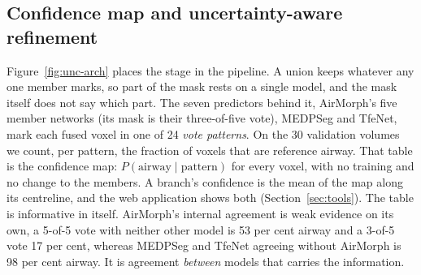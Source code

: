 \documentclass[runningheads]{llncs}
\begin{document}
\subsection{Confidence map and uncertainty-aware refinement}
\label{sec:confidence}
Figure~\ref{fig:unc-arch} places the stage in the pipeline. A union keeps
whatever any one member marks, so part of the mask rests on a
single model, and the mask itself does not say which part. The seven
predictors behind it, AirMorph's five member networks (its mask is their
three-of-five vote), MEDPSeg and TfeNet, mark each fused voxel in one of 24
\emph{vote patterns}. On the 30 validation volumes we count, per pattern, the
fraction of voxels that are reference airway. That table is the confidence
map: $P(\text{airway}\mid\text{pattern})$ for every voxel, with no training and
no change to the members. A branch's confidence is the mean of the map along
its centreline, and the web application shows both (Section~\ref{sec:tools}).
The table is informative in itself. AirMorph's internal agreement is weak
evidence on its own, a 5-of-5 vote with neither other model is 53 per cent
airway and a 3-of-5 vote 17 per cent, whereas MEDPSeg and TfeNet agreeing
without AirMorph is 98 per cent airway. It is agreement \emph{between} models
that carries the information.
\end{document}
